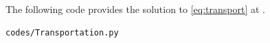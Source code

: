 \begin{enumerate}[label=\arabic*.,ref=\thesection.\theenumi]
The following code provides the solution to \eqref{eq:transport} at .
%
\begin{lstlisting}
codes/Transportation.py
\end{lstlisting}





\end{enumerate}
%    
    
